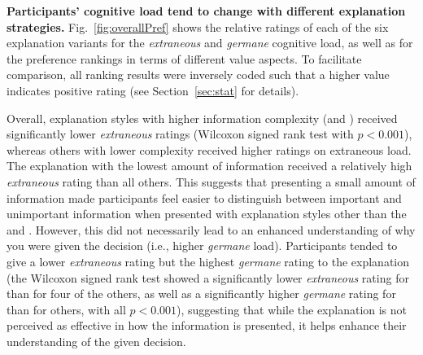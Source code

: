 \textbf{Participants' cognitive load tend to change with different explanation strategies.}\label{sec:exp-overall} Fig.~\ref{fig:overallPref} shows the relative ratings of each of the six explanation variants for the {\it extraneous} and {\it germane} cognitive load, as well as for the preference rankings in terms of different value aspects. To facilitate comparison, all ranking results were inversely coded such that a higher value indicates positive rating (see Section~\ref{sec:stat} for details).

Overall, explanation styles with higher information complexity (\comp and \cbho) received significantly lower \textit{extraneous} ratings (Wilcoxon signed rank test with $p<0.001$), whereas others with lower complexity received higher ratings on extraneous load. The \cf explanation with the lowest amount of information received a relatively high {\it extraneous} rating than all others. This suggests that presenting a small amount of information made participants feel easier to distinguish between important and unimportant information when presented with explanation styles other than the \comp and \cbho. However, this did not necessarily lead to an enhanced understanding of why you were given the decision (i.e., higher \textit{germane} load). Participants tended to give a lower {\it extraneous} rating but the highest {\it germane} rating to the \comp explanation (the Wilcoxon signed rank test showed a significantly lower {\it extraneous} rating for \comp than for four of the others, as well as a significantly higher {\it germane} rating for \comp than for others, with all $p<0.001$), suggesting that while the \comp explanation is not perceived as effective in how the information is presented, it helps enhance their understanding of the given decision.